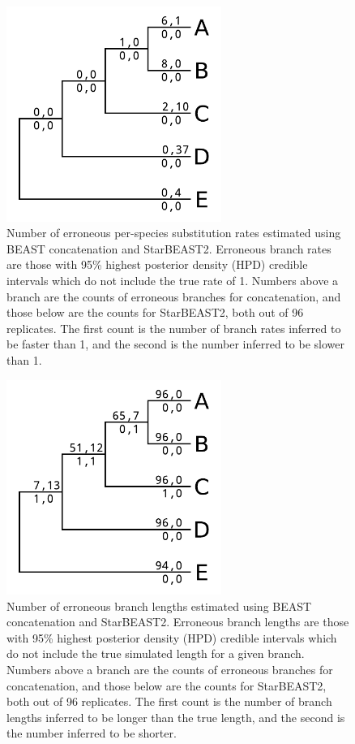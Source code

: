 \documentclass[12pt]{article}
\begin{document}
\begin{figure}[htb!]
\centering
\includegraphics[width=70mm]{false_branch_rates.pdf}
\caption
{Number of erroneous per-species substitution rates estimated using BEAST concatenation and StarBEAST2. Erroneous
branch rates are those with 95\% highest posterior density (HPD) credible intervals which do not include the true rate of 1.
Numbers above a branch are the counts of erroneous branches for concatenation, and those
below are the counts for StarBEAST2, both out of 96 replicates. The first count is
the number of branch rates inferred to be faster than 1, and the
second is the number inferred to be slower than 1.}
\label{fig:spilsBranchRates}
\end{figure}

\begin{figure}[htb!]
\centering
\includegraphics[width=70mm]{false_branch_lengths.pdf}
\caption
{Number of erroneous branch lengths estimated using BEAST concatenation and StarBEAST2. Erroneous
branch lengths are those with 95\% highest posterior density (HPD) credible intervals which do not include the true simulated length for a given branch.
Numbers above a branch are the counts of erroneous branches for concatenation, and those
below are the counts for StarBEAST2, both out of 96 replicates. The first count is
the number of branch lengths inferred to be longer than the true length, and the
second is the number inferred to be shorter.}
\label{fig:spilsBranchLengths}
\end{figure}
\end{document}
